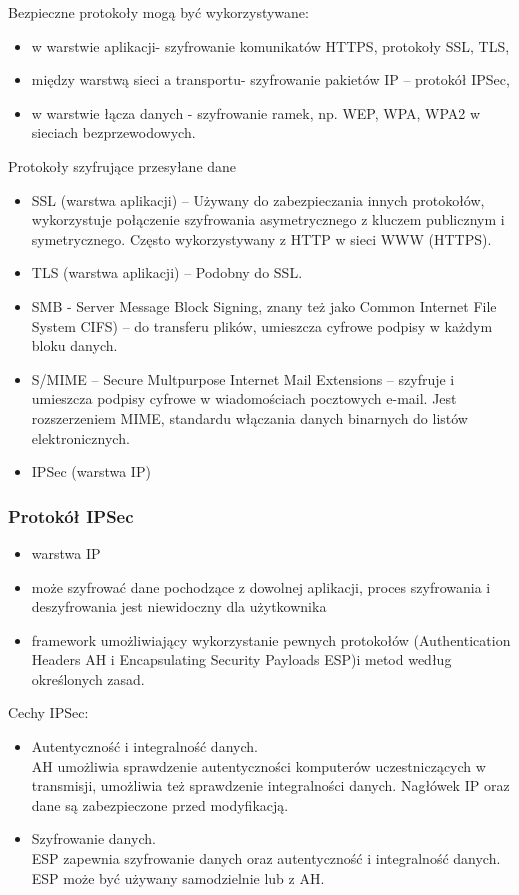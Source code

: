 \documentclass[../main.tex]{subfiles}
\begin{document}
Bezpieczne protokoły mogą być wykorzystywane:
\begin{itemize}
    \item w warstwie aplikacji- szyfrowanie komunikatów HTTPS, protokoły SSL, TLS,
    \item między warstwą sieci a transportu- szyfrowanie
    pakietów IP – protokół IPSec,
    \item w warstwie łącza danych - szyfrowanie ramek, np. WEP,
    WPA, WPA2 w sieciach bezprzewodowych.
\end{itemize}


Protokoły szyfrujące przesyłane dane
\begin{itemize}
    \item SSL (warstwa aplikacji) – Używany do zabezpieczania innych protokołów, wykorzystuje
    połączenie szyfrowania asymetrycznego z kluczem publicznym i symetrycznego. Często
    wykorzystywany z HTTP w sieci WWW (HTTPS).
    \item TLS (warstwa aplikacji) – Podobny do SSL.
    \item SMB - Server Message Block Signing, znany też jako Common Internet File System CIFS) – do
    transferu plików, umieszcza cyfrowe podpisy w każdym bloku danych.
    \item S/MIME – Secure Multpurpose Internet Mail Extensions – szyfruje i umieszcza podpisy
    cyfrowe w wiadomościach pocztowych e-mail. Jest rozszerzeniem MIME, standardu
    włączania danych binarnych do listów elektronicznych.
    \item IPSec (warstwa IP)
\end{itemize}

\subsubsection{Protokół IPSec}
\begin{itemize}
    \item warstwa IP
    \item może szyfrować dane pochodzące z dowolnej
    aplikacji, proces szyfrowania i deszyfrowania jest niewidoczny dla użytkownika
    \item framework umożliwiający wykorzystanie pewnych protokołów (Authentication Headers AH i Encapsulating Security Payloads ESP)i
    metod według określonych zasad.
\end{itemize}



Cechy IPSec:
\begin{itemize}
    \item Autentyczność i integralność danych.\\
    AH umożliwia sprawdzenie autentyczności komputerów uczestniczących
    w transmisji, umożliwia też sprawdzenie integralności danych. Nagłówek IP oraz dane są
    zabezpieczone przed modyfikacją.
    \item Szyfrowanie danych.\\
    ESP zapewnia szyfrowanie danych oraz autentyczność i integralność danych. ESP może być
    używany samodzielnie lub z AH.
\end{itemize}
\end{document}
